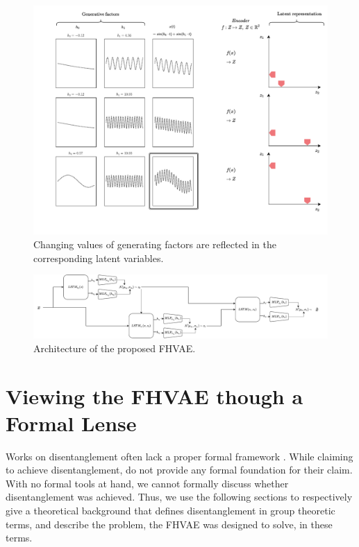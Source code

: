 \documentclass{article} %
\begin{document}
\begin{figure}
	\centering
	\includegraphics[width=.6\linewidth]{../figures/intution_3x3_3.pdf}
	\caption{Changing values of generating factors are reflected in the corresponding latent variables.}
\end{figure}
\begin{figure}
	\centering
	\includegraphics[width=1\linewidth]{../figures/fhvae_complete.pdf}
	\caption{Architecture of the proposed FHVAE.}
\end{figure}



\section*{Viewing the FHVAE though a Formal Lense}
Works on disentanglement often lack a proper formal framework \cite{higgins2018towards}. While claiming to achieve disentanglement, \citet{hsu2017unsupervised} do not provide any formal foundation for their claim. With no formal tools at hand, we cannot formally discuss whether disentanglement was achieved. Thus, we use the following sections to respectively give a theoretical background that defines disentanglement in group theoretic terms, and describe the problem, the FHVAE was designed to solve, in these terms.
\end{document}
